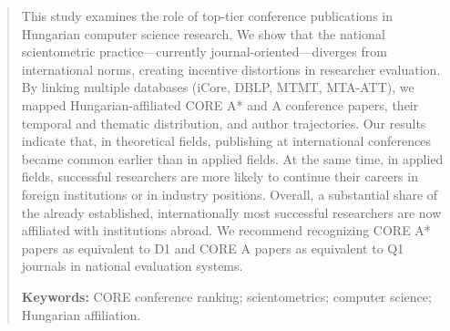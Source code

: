 \documentclass[12pt,a4paper]{article}
\begin{document}


\begin{abstract}
This study examines the role of top-tier conference publications in Hungarian computer science research. We show that the national scientometric practice—currently journal-oriented—diverges from international norms, creating incentive distortions in researcher evaluation. By linking multiple databases (iCore, DBLP, MTMT, MTA-ATT), we mapped Hungarian-affiliated CORE A\!* and A conference papers, their temporal and thematic distribution, and author trajectories. Our results indicate that, in theoretical fields, publishing at international conferences became common earlier than in applied fields. At the same time, in applied fields, successful researchers are more likely to continue their careers in foreign institutions or in industry positions. Overall, a substantial share of the already established, internationally most successful researchers are now affiliated with institutions abroad. We recommend recognizing CORE A\!* papers as equivalent to D1 and CORE A papers as equivalent to Q1 journals in national evaluation systems.
\par\medskip
\textbf{Keywords:} CORE conference ranking; scientometrics; computer science; Hungarian affiliation.
\end{abstract}
\end{document}

